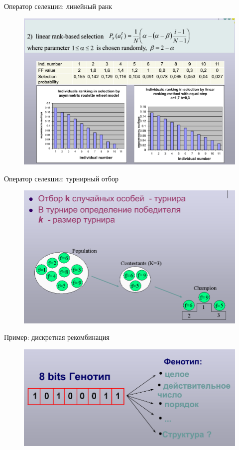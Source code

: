 \documentclass{beamer}
\begin{document}
\begin{frame}{Оператор селекции: линейный ранк}
\begin{figure}[h]
\centering
\includegraphics[scale=0.4]{images/lec04-pic22.png}
\end{figure}
\end{frame}

\begin{frame}{Оператор селекции: турнирный отбор}
\begin{figure}[h]
\centering
\includegraphics[scale=0.4]{images/lec04-pic23.png}
\end{figure}
\end{frame}

\begin{frame}{Пример: дискретная рекомбинация}
\begin{figure}[h]
\centering
\includegraphics[scale=0.4]{images/lec04-pic24.png}
\end{figure}
\end{frame}
\end{document}
